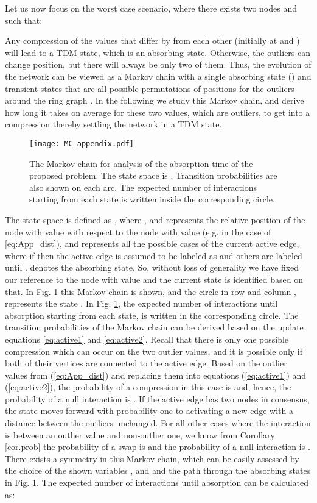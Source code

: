 \documentclass[conference]{IEEEtran}
\theoremstyle{definition}
\theoremstyle{definition}
\begin{document}
Let us now focus on the worst case scenario, where there exists two nodes  and  such that:

Any compression of the values that differ by  from each other (initially at  and ) will lead to a TDM state, which is an absorbing state. Otherwise, the outliers can change position, but there will always be only two of them. Thus, the evolution of the network can be viewed as a Markov chain with a single absorbing state () and  transient states that are all possible permutations of positions for the outliers around the ring graph . In the following we study this Markov chain, and derive how long it takes on average for these two values, which are outliers, to get into a compression thereby settling the network in a TDM state. 
\begin{figure}[htp]
\centering
\centerline{\texttt{[image: MC\_appendix.pdf]}}
\hfill
\caption{The Markov chain for analysis of the absorption time of the proposed problem. The state space is . Transition probabilities are also shown on each arc. The expected number of interactions starting from each state is written inside the corresponding circle.}
\label{fig:MC_app}
\end{figure}
The state space is defined as , where , and  represents the relative position of the node with value  with respect to the node with value  (e.g.  in the case of \eqref{eq:App_dist}), and  represents  all the  possible cases of the current active edge, where if  then the active edge  is assumed to be labeled as  and others are labeled until .   denotes the absorbing state. So, without loss of generality we have fixed our reference to the node with value  and the current state is identified based on that.
In Fig. \ref{fig:MC_app} this Markov chain is shown, and the circle in row  and column , represents the state . In Fig. \ref{fig:MC_app}, the expected number of interactions until absorption starting from each state, is written in the corresponding circle. The transition probabilities of the Markov chain can be derived based on the update equations \eqref{eq:active1} and \eqref{eq:active2}. Recall that there is only one possible compression which can occur on the two outlier values, and it is possible only if both of their vertices are connected to the active edge. Based on the outlier values from (\ref{eq:App_dist}) and replacing them into equations (\ref{eq:active1}) and (\ref{eq:active2}), the probability of a compression in this case is  and, hence, the probability of a null interaction is . If the active edge has two nodes in consensus, the state moves forward with probability one to activating a new edge with a distance between the outliers unchanged. For all other cases where the interaction is between an outlier value and non-outlier one, we know from Corollary \ref{cor.prob} the probability of a swap is  and the probability of a null interaction is . There exists a symmetry in this Markov chain, which can be easily assessed by the choice of the shown variables , and  and the path through the absorbing states  in Fig. \ref{fig:MC_app}.
The expected number of interactions until absorption can be calculated as:
\end{document}
